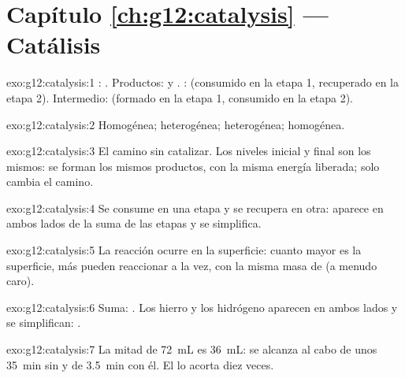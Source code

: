 \section*{Capítulo \ref{ch:g12:catalysis} --- Catálisis}

\begin{solution}{exo:g12:catalysis:1}
: . Productos:  y . : 
(consumido en la etapa 1, recuperado en la etapa 2). Intermedio: 
(formado en la etapa 1, consumido en la etapa 2).
\end{solution}

\begin{solution}{exo:g12:catalysis:2}
Homogénea; heterogénea; heterogénea; homogénea.
\end{solution}

\begin{solution}{exo:g12:catalysis:3}
El camino sin catalizar. Los niveles inicial y final son los mismos: se
forman los mismos productos, con la misma energía liberada; solo cambia
el camino.
\end{solution}

\begin{solution}{exo:g12:catalysis:4}
Se consume en una etapa y se recupera en otra: aparece en ambos lados de
la suma de las etapas y se simplifica.
\end{solution}

\begin{solution}{exo:g12:catalysis:5}
La reacción ocurre en la superficie: cuanto mayor es la superficie, más
 pueden reaccionar a la vez, con la misma masa de 
(a menudo caro).
\end{solution}

\begin{solution}{exo:g12:catalysis:6}
Suma: . Los  hierro y los  hidrógeno aparecen en
ambos lados y se simplifican: .
\end{solution}

\begin{solution}{exo:g12:catalysis:7}
La mitad de \qty{72}{mL} es \qty{36}{mL}: se alcanza al cabo de unos
\qty{35}{min} sin  y de \qty{3.5}{min} con él. El 
lo acorta diez veces.
\end{solution}

